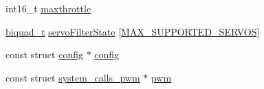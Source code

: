 \begin{DoxyCompactItemize}
int16\+\_\+t \hyperlink{structmixer_a6b23844f6e43b9e81e17ab6b794fc8fe}{maxthrottle}
\item 
\hyperlink{filter_8h_a7256a3fa62e7894f819ddd905006ad2e}{biquad\+\_\+t} \hyperlink{structmixer_a6e8393f54c0783445ab118308e887615}{servo\+Filter\+State} \mbox{[}\hyperlink{config_2mixer_8h_ada6fb418c359e00906599a7f6ac6c92d}{M\+A\+X\+\_\+\+S\+U\+P\+P\+O\+R\+T\+E\+D\+\_\+\+S\+E\+R\+V\+O\+S}\mbox{]}
\item 
const struct \hyperlink{structconfig}{config} $\ast$ \hyperlink{structmixer_aca479784a6e3381db854bd18219be34d}{config}
\item 
const struct \hyperlink{structsystem__calls__pwm}{system\+\_\+calls\+\_\+pwm} $\ast$ \hyperlink{structmixer_a4078c7c29ab6137cb7a37e5e71b4080b}{pwm}
\end{DoxyCompactItemize}


